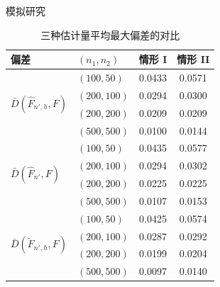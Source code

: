 \documentclass{beamer}
\begin{document}
\begin{frame}{模拟研究}
\small
\vspace{-0.3cm}
\begin{table}[!htb]
\caption{三种估计量平均最大偏差的对比}
\begin{center}
\begin{tabular}{llcc}
        \toprule
        偏差 & $(n_1,n_2)$ & 情形 I & 情形 II \\
        \midrule
        \multirow{4}{*}{$\bar{D}(\hat{F}_{n',h},F)$} 
            & $(100,50)$    & 0.0433 & 0.0571\\
            & $(200,100)$   & 0.0294 & 0.0300 \\
            & $(200,200)$   & 0.0209 & 0.0209 \\
            & $(500,500)$   & 0.0100 & 0.0144 \\
        \midrule
        \multirow{4}{*}{$\bar{D}(\hat{F}_{n'},F)$} 
            & $(100,50)$    & 0.0435 & 0.0577\\
            & $(200,100)$   & 0.0294 & 0.0302 \\
            & $(200,200)$   & 0.0225 & 0.0225 \\
            & $(500,500)$   & 0.0107 & 0.0153\\
        \midrule
        \multirow{4}{*}{$\bar{D}(\tilde{F}_{n',h},F)$} 
            & $(100,50)$    & 0.0425 & 0.0574 \\
            & $(200,100)$   & 0.0287 & 0.0292 \\
            & $(200,200)$   & 0.0199 & 0.0204 \\
            & $(500,500)$   & 0.0097 & 0.0140\\
        \bottomrule
    \end{tabular}
\end{center}
\end{table}
\end{frame}
\end{document}
